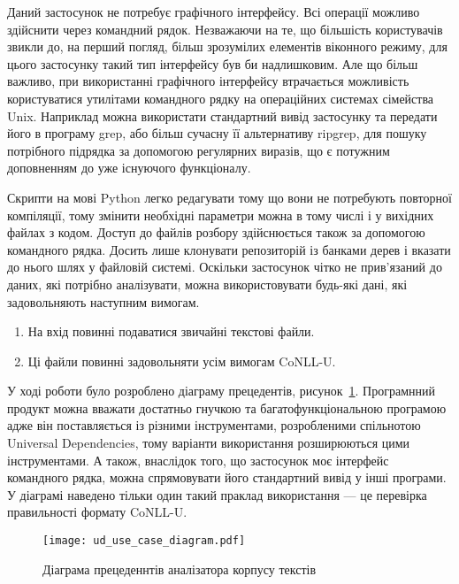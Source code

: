 Даний застосунок не потребує графічного інтерфейсу.
Всі операції можливо здійснити через командний рядок.
Незважаючи на те, що більшість користувачів звикли до, на перший погляд,
більш зрозумілих елементів
віконного режиму, для цього застосунку такий тип інтерфейсу був би надлишковим.
Але що більш важливо, при використанні графічного інтерфейсу втрачається
можливість користуватися утилітами командного рядку на операційних
системах сімейства Unix. Наприклад можна використати стандартний
вивід застосунку та передати його в програму grep, або більш сучасну її
альтернативу ripgrep, для пошуку потрібного підрядка за допомогою
регулярних виразів, що є потужним доповненням до уже існуючого
функціоналу.

Скрипти на мові Python легко редагувати тому що вони не
потребують повторної компіляції, тому змінити необхідні параметри можна в тому
числі і у вихідних файлах з кодом. Доступ до файлів розбору здійснюється
також за допомогою командного рядка. Досить лише клонувати репозиторій із
банками дерев і вказати до нього шлях у файловій системі. Оскільки застосунок
чітко не прив'язаний до даних, які потрібно аналізувати, можна використовувати будь-які
дані, які задовольняють наступним вимогам.

\begin{enumerate}
    \item На вхід повинні подаватися звичайні текстові файли.
    \item Ці файли повинні задовольняти усім вимогам CoNLL-U.
\end{enumerate}

У ході роботи було розроблено діаграму прецедентів, рисунок~\ref{img:use_case_diagram}. 
Програмнний продукт можна вважати достатньо
гнучкою та багатофункціональною програмою адже він поставляється із різними
інструментами, розробленими спільнотою Universal Dependencies, тому
варіанти використання розширюються цими інструментами. А також, внаслідок
того, що застосунок моє інтерфейс командного рядка, можна спрямовувати його
стандартний вивід у інші програми.
У діаграмі наведено
тільки один такий праклад використання --- це перевірка правильності формату
CoNLL-U.

\begin{figure}[ht]
  \begin{center}
    \texttt{[image: ud\_use\_case\_diagram.pdf]}
  \end{center}
  \caption{Діаграма прецеденнтів аналізатора корпусу текстів}
  \label{img:use_case_diagram}
\end{figure}

